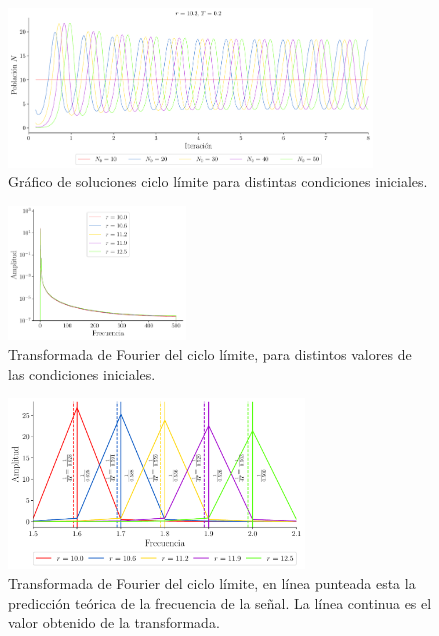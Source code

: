 \documentclass[twocolumn,aps,prl]{revtex4-1}
\begin{document}
\begin{figure}[ht!]
    \centering
        \centering
        \includegraphics[width = 0.86\textwidth]{scripts/ex2-aprox.pdf} 
        \caption{Gráfico de soluciones ciclo límite para distintas condiciones iniciales.}
        \label{fig:scripts/ex2-aprox}
\end{figure}

\begin{figure}[ht!]
    \centering
        \centering
        \includegraphics[width = 0.42\textwidth]{scripts/ex2-fourier-log.pdf}
        \caption{Transformada de Fourier del ciclo límite, para distintos valores de las condiciones iniciales.}
        \label{fig:scripts/ex2-fourier-log}
\end{figure}

\begin{figure}[ht!]
    \centering
        \centering
        \includegraphics[width = 0.7\textwidth]{scripts/ex2-fourier-acotado.pdf}
        \caption{Transformada de Fourier del ciclo límite, en línea punteada esta la predicción teórica de la frecuencia de la señal. La línea continua es el valor obtenido de la transformada.}
        \label{fig:scripts/ex2-fourier-acotado}
\end{figure}
\end{document}
